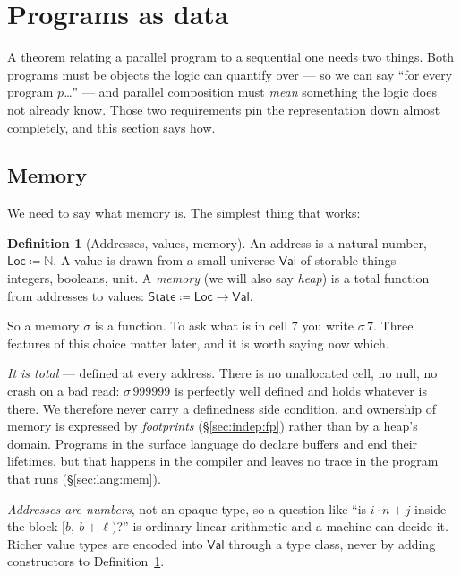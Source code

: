 \documentclass[11pt,a4paper]{article}
\theoremstyle{definition}
\newtheorem{definition}{Definition}
\theoremstyle{plain}
\theoremstyle{remark}
\newcommand{\st}{\sigma}
\newcommand{\Loc}{\mathsf{Loc}}
\newcommand{\Val}{\mathsf{Val}}
\newcommand{\State}{\mathsf{State}}
\begin{document}
\section{Programs as data}\label{sec:model}

A theorem relating a parallel program to a sequential one needs two things. Both programs
must be objects the logic can quantify over --- so we can say ``for every program
$p$\ldots'' --- and parallel composition must \emph{mean} something the logic does not
already know. Those two requirements pin the representation down almost completely, and
this section says how.

\subsection{Memory}\label{sec:model:heap}

We need to say what memory is. The simplest thing that works:

\begin{definition}[Addresses, values, memory]\label{def:heap}
An address is a natural number, $\Loc \coloneqq \mathbb{N}$. A value is drawn from a small
universe $\Val$ of storable things --- integers, booleans, unit. A \emph{memory} (we will
also say \emph{heap}) is a total function from addresses to values:
$\State \coloneqq \Loc \to \Val$.
\end{definition}

So a memory $\st$ is a function. To ask what is in cell $7$ you write $\st\,7$. Three
features of this choice matter later, and it is worth saying now which.

\emph{It is total} --- defined at every address. There is no unallocated cell, no null, no
crash on a bad read: $\st\,999999$ is perfectly well defined and holds whatever is there.
We therefore never carry a definedness side condition, and ownership of memory is expressed
by \emph{footprints} (\S\ref{sec:indep:fp}) rather than by a heap's domain. Programs in the
surface language do declare buffers and end their lifetimes, but that happens in the
compiler and leaves no trace in the program that runs (\S\ref{sec:lang:mem}).

\emph{Addresses are numbers}, not an opaque type, so a question like ``is $i \cdot n + j$
inside the block $[b,\ b+\ell)$?'' is ordinary linear arithmetic and a machine can decide
it. Richer value types are encoded into $\Val$ through a type class, never by adding
constructors to Definition~\ref{def:heap}.
\end{document}
